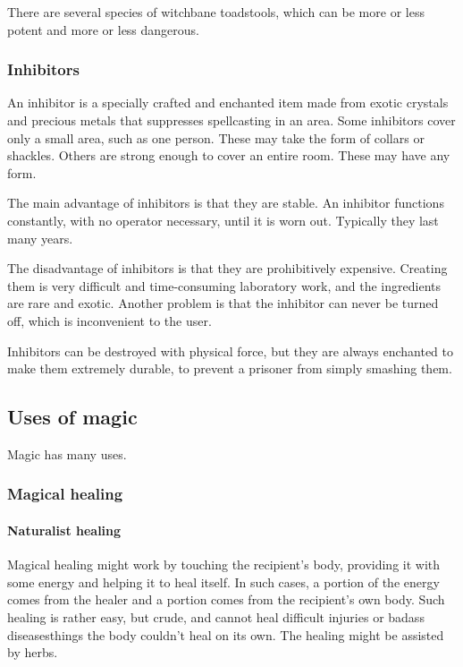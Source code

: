 There are several species of witchbane toadstools, which can be more or less potent and more or less dangerous. 





\subsubsection{Inhibitors}
An inhibitor is a specially crafted and enchanted item made from exotic crystals and precious metals that suppresses spellcasting in an area. Some inhibitors cover only a small area, such as one person. These may take the form of collars or shackles. Others are strong enough to cover an entire room. These may have any form. 

The main advantage of inhibitors is that they are stable. An inhibitor functions constantly, with no operator necessary, until it is worn out. Typically they last many years. 

The disadvantage of inhibitors is that they are prohibitively expensive. Creating them is very difficult and time-consuming laboratory work, and the ingredients are rare and exotic. Another problem is that the inhibitor can never be turned off, which is inconvenient to the user. 

Inhibitors can be destroyed with physical force, but they are always enchanted to make them extremely durable, to prevent a prisoner from simply smashing them.










\subsection{Uses of magic}
Magic has many uses. 









\subsubsection{Magical healing}
\paragraph{Naturalist healing}
Magical healing might work by touching the recipient's  body, providing it with some energy and helping it to heal itself. In such cases, a portion of the energy comes from the healer and a portion comes from the recipient's own body. Such healing is rather easy, but crude, and cannot heal difficult injuries or badass diseases\dash things the body couldn't heal on its own. The healing might be assisted by herbs.

